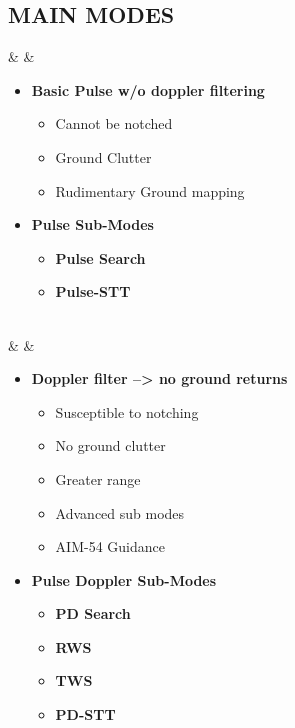 \documentclass[fontInter]{TechCheck}
\begin{document}
	\subsection{MAIN MODES}
	\begin{listlongtable}
		\textbf{\textbullet} &  &
		\begin{minipage}[t]{\linewidth}
			\vspace{-7pt}
			\begin{itemize}
				\item \textbf{Basic Pulse w/o doppler filtering}
				\begin{itemize}
					\item Cannot be notched
					\item Ground Clutter
					\item Rudimentary Ground mapping
				\end{itemize}
				\item \textbf{Pulse Sub-Modes}
				\begin{itemize}
					\item \textbf{Pulse Search}
					\item \textbf{Pulse-STT}
				\end{itemize}
			\end{itemize}
		\end{minipage} \\
		\midrule
		\textbf{\textbullet} &  &
		\begin{minipage}[t]{\linewidth}
			\vspace{-7pt}
			\begin{itemize}
				\item \textbf{Doppler filter --> no ground returns}
				\begin{itemize}
					\item Susceptible to notching
					\item No ground clutter
					\item Greater range
					\item Advanced sub modes
					\item AIM-54 Guidance
				\end{itemize}
				\item \textbf{Pulse Doppler Sub-Modes}
				\begin{itemize}
					\item \textbf{PD Search}
					\item \textbf{RWS}
					\item \textbf{TWS}
					\item \textbf{PD-STT}
				\end{itemize}
			\end{itemize}
		\end{minipage} \\
	\end{listlongtable}
\end{document}
